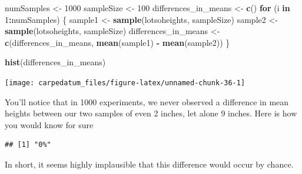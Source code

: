 \documentclass[openany]{book}
\newenvironment{Shaded}{\begin{snugshade}}{\end{snugshade}}
\newcommand{\CommentTok}[1]{\textcolor[rgb]{0.56,0.35,0.01}{\textit{#1}}}
\newcommand{\ControlFlowTok}[1]{\textcolor[rgb]{0.13,0.29,0.53}{\textbf{#1}}}
\newcommand{\DecValTok}[1]{\textcolor[rgb]{0.00,0.00,0.81}{#1}}
\newcommand{\KeywordTok}[1]{\textcolor[rgb]{0.13,0.29,0.53}{\textbf{#1}}}
\newcommand{\NormalTok}[1]{#1}
\newcommand{\OperatorTok}[1]{\textcolor[rgb]{0.81,0.36,0.00}{\textbf{#1}}}
\newcommand{\StringTok}[1]{\textcolor[rgb]{0.31,0.60,0.02}{#1}}
\begin{document}
\begin{Shaded}
\begin{Highlighting}[]
\NormalTok{numSamples <-}\StringTok{ }\DecValTok{1000}
\NormalTok{sampleSize <-}\StringTok{ }\DecValTok{100}
\NormalTok{differences_in_means <-}\StringTok{ }\KeywordTok{c}\NormalTok{()}
\ControlFlowTok{for}\NormalTok{ (i }\ControlFlowTok{in} \DecValTok{1}\OperatorTok{:}\NormalTok{numSamples) \{}
\NormalTok{  sample1 <-}\StringTok{ }\KeywordTok{sample}\NormalTok{(lotsoheights, sampleSize)}
\NormalTok{  sample2 <-}\StringTok{ }\KeywordTok{sample}\NormalTok{(lotsoheights, sampleSize)}
\NormalTok{  differences_in_means <-}\StringTok{ }\KeywordTok{c}\NormalTok{(differences_in_means, }\KeywordTok{mean}\NormalTok{(sample1) }\OperatorTok{-}\StringTok{ }\KeywordTok{mean}\NormalTok{(sample2))}
\NormalTok{\}}

\KeywordTok{hist}\NormalTok{(differences_in_means)}
\end{Highlighting}
\end{Shaded}

\begin{center}\texttt{[image: carpedatum\_files/figure-latex/unnamed-chunk-36-1]} \end{center}

You'll notice that in 1000 experiments, we never observed a difference in mean heights between our two samples of even 2 inches, let alone 9 inches. Here is how you would know for sure

\begin{Shaded}
\end{Shaded}

\begin{verbatim}
## [1] "0%"
\end{verbatim}

In short, it seems highly implausible that this difference would occur by chance.
\end{document}
